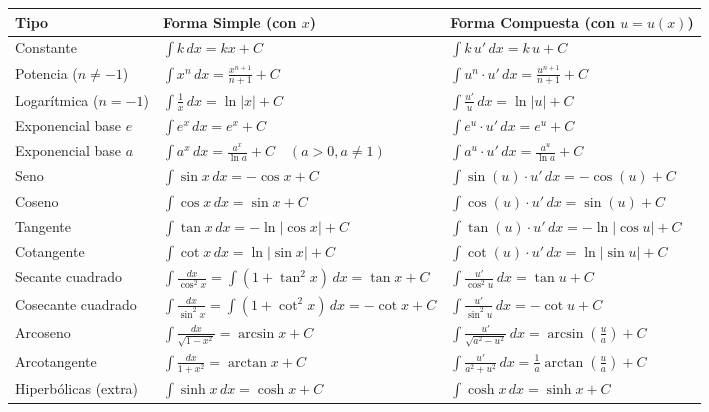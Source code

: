 \documentclass[10pt,a4paper]{article}
\begin{document}
\begin{center}
\renewcommand{\arraystretch}{1.55}
\small
\begin{tabularx}{\linewidth}{@{}l X X@{}}
\toprule
\textbf{Tipo} & \textbf{Forma Simple (con $x$)} & \textbf{Forma Compuesta (con $u = u(x)$)} \\
\midrule
Constante & $\displaystyle \int k\,dx = kx + C$ & $\displaystyle \int k\,u'\,dx = k\,u + C$ \\
Potencia ($n \neq -1$) & $\displaystyle \int x^n\,dx = \frac{x^{n+1}}{n+1} + C$ & $\displaystyle \int u^n \cdot u'\,dx = \frac{u^{n+1}}{n+1} + C$ \\
Logarítmica ($n = -1$) & $\displaystyle \int \frac{1}{x}\,dx = \ln|x| + C$ & $\displaystyle \int \frac{u'}{u}\,dx = \ln|u| + C$ \\
Exponencial base $e$ & $\displaystyle \int e^x\,dx = e^x + C$ & $\displaystyle \int e^u \cdot u'\,dx = e^u + C$ \\
Exponencial base $a$ & $\displaystyle \int a^x\,dx = \frac{a^x}{\ln a} + C \quad (a>0, a\neq 1)$ & $\displaystyle \int a^u \cdot u'\,dx = \frac{a^u}{\ln a} + C$ \\
Seno & $\displaystyle \int \sin x\,dx = -\cos x + C$ & $\displaystyle \int \sin(u)\cdot u'\,dx = -\cos(u) + C$ \\
Coseno & $\displaystyle \int \cos x\,dx = \sin x + C$ & $\displaystyle \int \cos(u)\cdot u'\,dx = \sin(u) + C$ \\
Tangente & $\displaystyle \int \tan x\,dx = -\ln|\cos x| + C$ & $\displaystyle \int \tan(u)\cdot u'\,dx = -\ln|\cos u| + C$ \\
Cotangente & $\displaystyle \int \cot x\,dx = \ln|\sin x| + C$ & $\displaystyle \int \cot(u)\cdot u'\,dx = \ln|\sin u| + C$ \\
Secante cuadrado & $\displaystyle \int \frac{dx}{\cos^2 x} = \int (1+\tan^2 x)\,dx = \tan x + C$ & $\displaystyle \int \frac{u'}{\cos^2 u}\,dx = \tan u + C$ \\
Cosecante cuadrado & $\displaystyle \int \frac{dx}{\sin^2 x} = \int (1+\cot^2 x)\,dx = -\cot x + C$ & $\displaystyle \int \frac{u'}{\sin^2 u}\,dx = -\cot u + C$ \\
Arcoseno & $\displaystyle \int \frac{dx}{\sqrt{1-x^2}} = \arcsin x + C$ & $\displaystyle \int \frac{u'}{\sqrt{a^2 - u^2}}\,dx = \arcsin\!\left(\frac{u}{a}\right) + C$ \\
Arcotangente & $\displaystyle \int \frac{dx}{1+x^2} = \arctan x + C$ & $\displaystyle \int \frac{u'}{a^2 + u^2}\,dx = \frac{1}{a}\arctan\!\left(\frac{u}{a}\right) + C$ \\
Hiperbólicas (extra) & $\displaystyle \int \sinh x\,dx = \cosh x + C$ & $\displaystyle \int \cosh x\,dx = \sinh x + C$ \\
\bottomrule
\end{tabularx}
\end{center}
\end{document}
